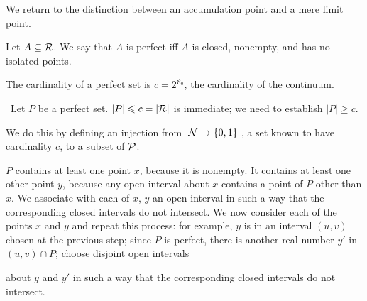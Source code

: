 We return to the distinction between an accumulation point and a mere
limit point.

\begin{definition}
 Let $A \subseteq {\cal R}$.  We say that $A$ is
 {\upshape perfect} iff $A$ is closed, nonempty, and has no isolated
 points.
\end{definition}

\begin{thm}
 The cardinality of a perfect set is $c =
 2^{\aleph_0}$, the cardinality of the continuum.
\end{thm}

\preuve\ Let $P$ be a perfect set.  $|P| \leq c = |{\cal R}|$ is
immediate; we need to establish $|P| \geq c$.

We do this by defining an injection from $[{\cal N}
\rightarrow \{0,1\}]$, a set known to have cardinality $c$, to a subset of
$\cal P$.

$P$ contains at least one point $x$, because it is nonempty.  It
contains at least one other point $y$, because any open interval about
$x$ contains a point of $P$ other than $x$.  We associate with each of
$x$, $y$ an open interval in such a way that the corresponding closed
intervals do not intersect.  We now consider each of the points $x$
and $y$ and repeat this process: for example, $y$ is in an interval
$(u,v)$ chosen at the previous step; since $P$ is perfect, there is
another real number $y'$ in $(u,v)\cap P$; choose
disjoint open 
intervals\linebreak

\pagebreak

about $y$ and $y'$ in such a way that the corresponding
closed intervals do not intersect.

